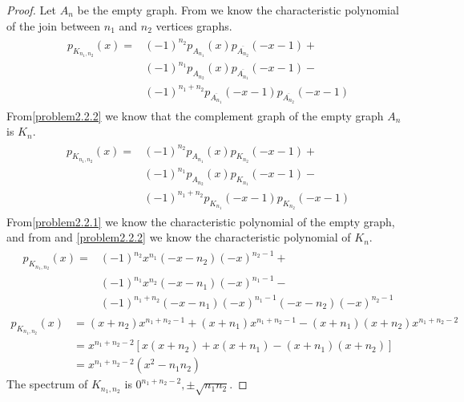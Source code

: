 \documentclass[a4paper, 11pt, oneside]{article}
\begin{document}
\begin{proof}
Let $A_n$  be the empty graph.
From \cite[Lemma 11]{adjacency_matrix} we know the characteristic polynomial of the join between $n_1$ and $n_2$ vertices graphs.
\begin{align*}
\begin{split}
p_{K_{n_1,n_2}}(x) = & (-1)^{n_2} p_{A_{n_1}}(x)   p_{\overline{A_{n_2}}}(-x-1) + \\
								   & (-1)^{n_1} p_{A_{n_2}} (x)  p_{\overline{A_{n_1}}}(-x-1) -  \\
								   &  (-1)^{n_1 + n_2} p_{\overline{A_{n_1}}}(-x-1) p_{\overline{A_{n_2}}}(-x-1)
\end{split}
\end{align*}
From\ref{problem2.2.2} we know that the complement graph of the empty graph $A_n$ is $K_n$.
\begin{align*}
\begin{split}
 p_{K_{n_1,n_2}}(x)  = & (-1)^{n_2} p_{A_{n_1}}(x)   p_{K_{n_2}}(-x-1) + \\
								   & (-1)^{n_1} p_{A_{n_2}} (x)  p_{K_{n_1}}(-x-1) -  \\
								   &  (-1)^{n_1 + n_2} p_{K_{n_1}}(-x-1) p_{K_{n_2}}(-x-1)
\end{split}
\end{align*}
From\ref{problem2.2.1} we know the characteristic polynomial of the empty graph, and from \cite[Example 4]{adjacency_matrix} and \ref{problem2.2.2} we know the characteristic polynomial of $K_n$.
\begin{align*}
\begin{split}
   p_{K_{n_1,n_2}}(x)   = & (-1)^{n_2} x^{n_1}   (-x - n_2)(-x) ^{n_2 - 1} + \\
								   & (-1)^{n_1} x^{n_2}  (-x - n_1)(-x) ^{n_1 - 1}-  \\
								   &  (-1)^{n_1 + n_2} (-x - n_1)(-x) ^{n_1 - 1} (-x - n_2)(-x) ^{n_2 - 1}
\end{split}
\end{align*}
\begin{align*}
p_{K_{n_1,n_2}}(x) &= (x + n_2) x ^ {n_1 + n_2 -1} + (x + n_1) x ^ {n_1 + n_2 -1} - (x + n_1)(x + n_2)x^{n_1 + n_2 - 2} \\&=
x ^ {n_1 + n_2 - 2} [ x(x + n_2) + x(x + n_1) - (x + n_1)(x + n_2)] \\&=
x ^ {n_1 + n_2 - 2}  (x^2 - n_1n_2)
\end{align*}
The spectrum of $K_{n_1,n_2}$ is $0 ^ {n_1 + n_2 - 2}, \pm\sqrt{n_1n_2}$.
\end{proof}
\end{document}
